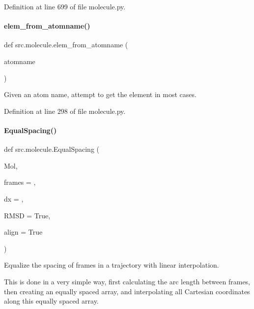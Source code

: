 Definition at line 699 of file molecule.\+py.

\mbox{\label{namespacesrc_1_1molecule_a4638e3bec89d2fa20ba340988456a1ac}} 
\paragraph{\texorpdfstring{elem\+\_\+from\+\_\+atomname()}{elem\_from\_atomname()}}
{\footnotesize\ttfamily def src.\+molecule.\+elem\+\_\+from\+\_\+atomname (\begin{DoxyParamCaption}\item[{}]{atomname }\end{DoxyParamCaption})}



Given an atom name, attempt to get the element in most cases. 



Definition at line 298 of file molecule.\+py.

\mbox{\label{namespacesrc_1_1molecule_af77e6cac48816736aa9a5cfa2f74071b}} 
\paragraph{\texorpdfstring{Equal\+Spacing()}{EqualSpacing()}}
{\footnotesize\ttfamily def src.\+molecule.\+Equal\+Spacing (\begin{DoxyParamCaption}\item[{}]{Mol,  }\item[{}]{frames = {},  }\item[{}]{dx = {},  }\item[{}]{R\+M\+SD = {\ttfamily True},  }\item[{}]{align = {\ttfamily True} }\end{DoxyParamCaption})}



Equalize the spacing of frames in a trajectory with linear interpolation. 

This is done in a very simple way, first calculating the arc length between frames, then creating an equally spaced array, and interpolating all Cartesian coordinates along this equally spaced array.

